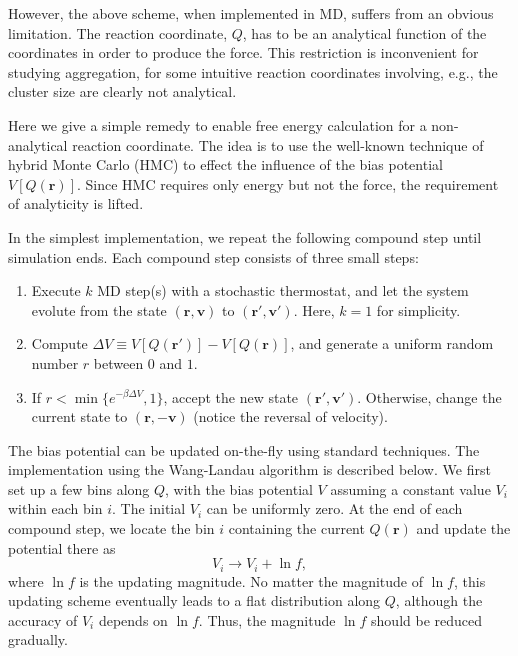 \documentclass[notitlepage, preprint,superscriptaddress]{revtex4-1}
\newcommand{\vct}[1]{\mathbf{#1}}
\newcommand{\vv}{\vct{v}}
\begin{document}
%
However, the above scheme, when implemented in MD,
suffers from an obvious limitation.
%
The reaction coordinate, $Q$,
has to be an analytical function of the coordinates
in order to produce the force.
%
This restriction is inconvenient
for studying aggregation,
for some intuitive reaction coordinates
involving, e.g., the cluster size
are clearly not analytical.



%
Here we give a simple remedy
to enable free energy calculation
for a non-analytical reaction coordinate.
%
The idea is to use
the well-known technique of hybrid Monte Carlo (HMC)
to effect the influence of the bias potential $V[Q(\vct{r})]$.
%
Since HMC requires only energy but not the force,
the requirement of analyticity is lifted.



%
In the simplest implementation,
we repeat the following compound step until simulation ends.
%
Each compound step consists of three small steps:
%
\begin{enumerate}
  \item Execute $k$ MD step(s) with a stochastic thermostat,
        and let the system evolute
        from the state $(\vct{r}, \vv)$ to $(\vct{r}', \vv')$.
        Here, $k = 1$ for simplicity.

  \item Compute $\Delta V \equiv V[Q(\vct{r}')] - V[Q(\vct{r})]$,
        and generate a uniform random number $r$ between $0$ and $1$.

  \item If $r < \min\{e^{-\beta \Delta V}, 1\}$,
        accept the new state $(\vct{r}', \vv')$.
        Otherwise, change the current state to $(\vct{r}, -\vv)$
        (notice the reversal of velocity).
\end{enumerate}



%
The bias potential can be updated on-the-fly
using standard techniques.
%
The implementation using the Wang-Landau algorithm\cite{
wang2001, *wang2001pre}
is described below.
%
We first set up a few bins along $Q$,
with the bias potential $V$ assuming a constant value $V_i$
within each bin $i$.
%
The initial $V_i$ can be uniformly zero.
%
At the end of each compound step,
we locate the bin $i$ containing the current $Q(\vct{r})$
and update the potential there as
%
\begin{equation}
V_i \rightarrow V_i + \ln f,
\end{equation}
%
where $\ln f$ is the updating magnitude.
%
No matter the magnitude of $\ln f$,
this updating scheme eventually leads to a flat distribution along $Q$,
although the accuracy of $V_i$ depends on $\ln f$.
%
Thus, the magnitude $\ln f$ should be reduced gradually\cite{
wang2001, *wang2001pre, belardinelli2007, *belardinelli2008}.
\end{document}
